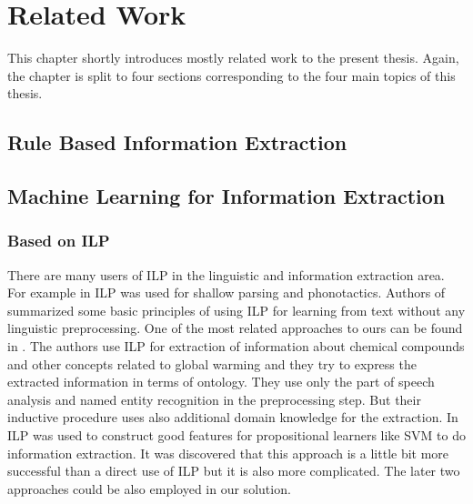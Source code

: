 \chapter{Related Work}

This chapter shortly introduces mostly related work to the present thesis. Again, the chapter is split to four sections corresponding to the four main topics of this thesis.



\section{Rule Based Information Extraction}




\section{Machine Learning for Information Extraction}



\subsection{Based on ILP}
There are many users of ILP in the linguistic and information extraction area.
For example in \citep{stasinos:phd} ILP was used for shallow parsing and phonotactics.
Authors of \citep{Junker99learningfor} summarized some basic principles of using ILP for learning from text without any linguistic preprocessing. One of the most related approaches to ours can be found in \citep{aitken02:_learn_infor_extrac_rules}. The authors use ILP for extraction of information about chemical compounds and other concepts related to global warming and they try to express the extracted information in terms of ontology. They use only the part of speech analysis and named entity recognition in the preprocessing step. But their inductive procedure uses also additional domain knowledge for the extraction. In \citep{Ramakrishnan:UsingILPforFeatures} ILP was used to construct good features for propositional learners like SVM to do information extraction. It was discovered that this approach is a little bit more successful than a direct use of ILP but it is also more complicated. The later two approaches could be also employed in our solution.

